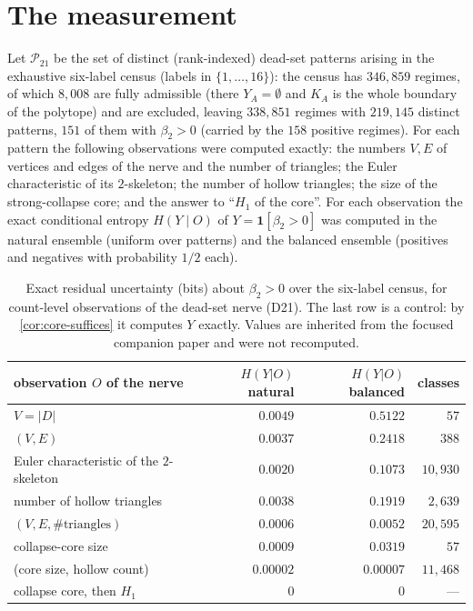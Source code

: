 \section{The measurement}\label{sec:D21}
Let $\mathcal P_{21}$ be the set of distinct (rank-indexed) dead-set patterns arising in the exhaustive six-label census (labels in $\{1,\dots,16\}$): the census has $346{,}859$ regimes, of which $8{,}008$ are fully admissible (there $Y_A=\emptyset$ and $K_A$ is the whole boundary of the polytope) and are excluded, leaving $338{,}851$ regimes with $219{,}145$ distinct patterns, $151$ of them with $\beta_2>0$ (carried by the $158$ positive regimes). For each pattern the following observations were computed exactly: the numbers $V,E$ of vertices and edges of the nerve and the number of triangles; the Euler characteristic of its $2$-skeleton; the number of hollow triangles; the size of the strong-collapse core; and the answer to ``$H_1$ of the core''. For each observation the exact conditional entropy $H(Y\mid O)$ of $Y=\mathbf 1[\beta_2>0]$ was computed in the natural ensemble (uniform over patterns) and the balanced ensemble (positives and negatives with probability $1/2$ each).
\begin{table}[ht]\centering\small
\begin{tabular}{@{}lrrr@{}}\toprule
observation $O$ of the nerve & $H(Y|O)$ natural & $H(Y|O)$ balanced & classes\\ \midrule
$V=|D|$ & $0.0049$ & $0.5122$ & $57$\\
$(V,E)$ & $0.0037$ & $0.2418$ & $388$\\
Euler characteristic of the $2$-skeleton & $0.0020$ & $0.1073$ & $10{,}930$\\
number of hollow triangles & $0.0038$ & $0.1919$ & $2{,}639$\\
$(V,E,\#\text{triangles})$ & $0.0006$ & $0.0052$ & $20{,}595$\\
collapse-core size & $0.0009$ & $0.0319$ & $57$\\
(core size, hollow count) & $0.00002$ & $0.00007$ & $11{,}468$\\
collapse core, then $H_1$ & $0$ & $0$ & ---\\ \bottomrule
\end{tabular}
\caption{Exact residual uncertainty (bits) about $\beta_2>0$ over the six-label census, for count-level observations of the dead-set nerve (D21). The last row is a control: by \cref{cor:core-suffices} it computes $Y$ exactly. Values are inherited from the focused companion paper and were not recomputed.}\label{tab:D21}
\end{table}
